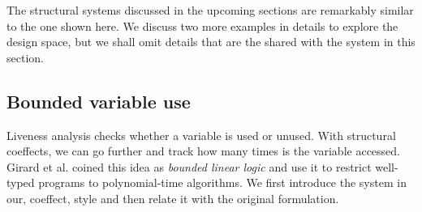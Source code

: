 The structural systems discussed in the upcoming sections are remarkably similar to the one
shown here. We discuss two more examples in details to explore the design space, but we shall
omit details that are the shared with the system in this section.


\subsection{Bounded variable use}

Liveness analysis checks whether a variable is used or unused. With structural coeffects, we can go
further and track how many times is the variable accessed. Girard et al. \cite{logic-bounded} coined
this idea as \emph{bounded linear logic} and use it to restrict well-typed programs to 
polynomial-time algorithms. We first introduce the system in our, coeffect, style and then 
relate it with the original formulation.


